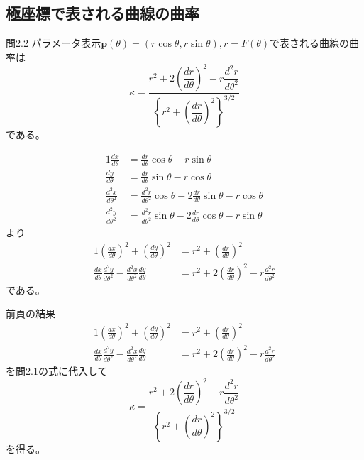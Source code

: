 \documentclass[a4j,disablejfam,dvipdfmx,papersize,slide,uplatex,21pt]{jsarticle}
\makeatletter
\renewenvironment{proof}[1][\proofname]{\par
        \pushQED{\qed}
        \normalfont
        \topsep6\p@\@plus6\p@ \trivlist
        \item[\hskip\labelsep{\bfseries #1}\@addpunct{\bfseries}]\ignorespaces
    }{%
        \popQED\endtrivlist\@endpefalse
    }
\renewcommand{\proofname}{証明.}
\makeatother
\begin{document}
\newpage
\subsection*{極座標で表される曲線の曲率}
\begin{itembox}[l]{問2.2}
    パラメータ表示$\bm{p}(\theta) = (r \cos\theta, r\sin\theta), r = F(\theta)$で表される曲線の曲率は
    \begin{equation}
        \kappa =
            \frac
                {r^2 + 2 \left( \dfrac{dr}{d\theta} \right)^2 - r \dfrac{d^2r}{d\theta^2}}
                {\left\{ r^2 + \left( \dfrac{dr}{d\theta} \right)^2 \right\}^{3/2}}
    \end{equation}
    である。
\end{itembox}

\newpage
\begin{proof}
    \begin{alignat}{1}
        \frac{dx}{d\theta} &= \frac{dr}{d\theta} \cos\theta - r \sin\theta \\
        \frac{dy}{d\theta} &= \frac{dr}{d\theta} \sin\theta - r \cos\theta \\
        \frac{d^2x}{d\theta^2} &= \frac{d^2r}{d\theta^2} \cos\theta - 2 \frac{dr}{d\theta} \sin\theta - r \cos\theta \\
        \frac{d^2y}{d\theta^2} &= \frac{d^2r}{d\theta^2} \sin\theta - 2 \frac{dr}{d\theta} \cos\theta - r \sin\theta
    \end{alignat}
    より
    \begin{alignat}{1}
        \left(\frac{dx}{d\theta}\right)^2 + \left(\frac{dy}{d\theta}\right)^2
            &= r^2 + \left(\frac{dr}{d\theta}\right)^2 \\
        \frac{dx}{d\theta} \frac{d^2y}{d\theta^2} - \frac{d^2x}{d\theta^2}\frac{dy}{d\theta}
            &= r^2 + 2\left(\frac{dr}{d\theta}\right)^2 - r \frac{d^2r}{d\theta^2}
    \end{alignat}
    である。

    \newpage
    前頁の結果
    \begin{alignat}{1}
        \left(\frac{dx}{d\theta}\right)^2 + \left(\frac{dy}{d\theta}\right)^2
            &= r^2 + \left(\frac{dr}{d\theta}\right)^2 \\
        \frac{dx}{d\theta} \frac{d^2y}{d\theta^2} - \frac{d^2x}{d\theta^2}\frac{dy}{d\theta}
            &= r^2 + 2\left(\frac{dr}{d\theta}\right)^2 - r \frac{d^2r}{d\theta^2}
    \end{alignat}
    を問2.1の式に代入して
    \begin{equation}
        \kappa =
            \frac
                {r^2 + 2 \left( \dfrac{dr}{d\theta} \right)^2 - r \dfrac{d^2r}{d\theta^2}}
                {\left\{ r^2 + \left( \dfrac{dr}{d\theta} \right)^2 \right\}^{3/2}}
    \end{equation}
    を得る。
\end{proof}
\end{document}
